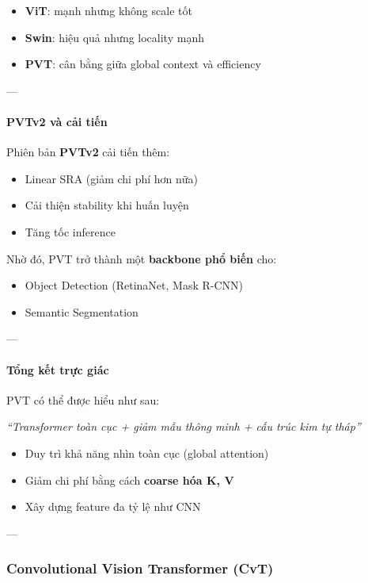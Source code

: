 \begin{itemize}
	\item \textbf{ViT}: mạnh nhưng không scale tốt
	\item \textbf{Swin}: hiệu quả nhưng locality mạnh
	\item \textbf{PVT}: cân bằng giữa global context và efficiency
\end{itemize}

---

\paragraph{PVTv2 và cải tiến}

Phiên bản \textbf{PVTv2} \cite{Wang2022} cải tiến thêm:

\begin{itemize}
	\item Linear SRA (giảm chi phí hơn nữa)
	\item Cải thiện stability khi huấn luyện
	\item Tăng tốc inference
\end{itemize}

Nhờ đó, PVT trở thành một \textbf{backbone phổ biến} cho:
\begin{itemize}
	\item Object Detection (RetinaNet, Mask R-CNN)
	\item Semantic Segmentation
\end{itemize}

---

\paragraph{Tổng kết trực giác}

PVT có thể được hiểu như sau:

\begin{center}
	\textit{“Transformer toàn cục + giảm mẫu thông minh + cấu trúc kim tự tháp”}
\end{center}

\begin{itemize}
	\item Duy trì khả năng nhìn toàn cục (global attention)
	\item Giảm chi phí bằng cách \textbf{coarse hóa K, V}
	\item Xây dựng feature đa tỷ lệ như CNN
\end{itemize}
---

\subsubsection{Convolutional Vision Transformer (CvT)}
\label{subsubsec:cvt}


